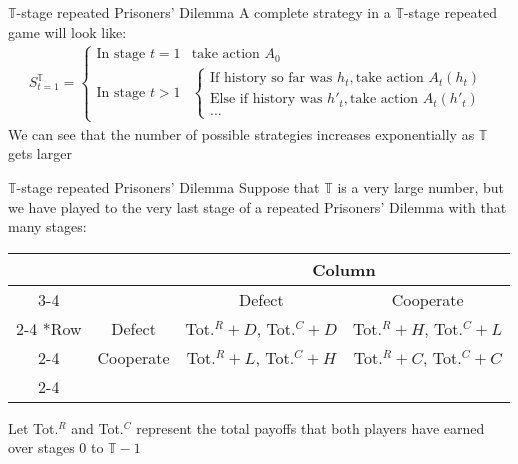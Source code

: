 
\begin{frame}{$\mathbb{T}$-stage repeated Prisoners' Dilemma}
  A complete strategy in a $\mathbb{T}$-stage repeated game will look like:
  \begin{align*}
    S_{t=1}^{\mathbb{T}} = 
    \begin{cases}
    \text{In stage } t=1 & \text{take action } A_0 \\ 
    \text{In stage } t>1 & 
    \begin{cases}
      \text{If history so far was } h_t, \text{take action } A_t(h_t) \\
      \text{Else if history was } h'_t, \text{take action } A_t(h'_t) \\ 
      ... 
    \end{cases}
    \end{cases}
  \end{align*}
  We can see that the number of possible strategies increases exponentially as $\mathbb{T}$ gets larger
\end{frame}

\begin{frame}{$\mathbb{T}$-stage repeated Prisoners' Dilemma}
  Suppose that $\mathbb{T}$ is a very large number, but we have played to the very last stage of a repeated Prisoners' Dilemma with that many stages:
  \begin{center}
    \begin{tabular}{*{4}{c|}}
      \multicolumn{2}{c}{} & \multicolumn{2}{c}{Column} \\ \cline{3-4}
      \multicolumn{1}{c}{} &        & Defect & Cooperate \\ \cline{2-4}
      \multirow{2}*{Row} & Defect   & Tot.$^R + D$, Tot.$^C + D$ & Tot.$^R + H$, Tot.$^C + L$ \\ \cline{2-4}
                         & Cooperate& Tot.$^R + L$, Tot.$^C + H$ & Tot.$^R + C$, Tot.$^C + C$ \\ \cline{2-4}
    \end{tabular} 
  \end{center}
  Let Tot.$^R$ and Tot.$^C$ represent the total payoffs that both players have earned over 
  stages 0 to $\mathbb{T} -1$
\end{frame}

